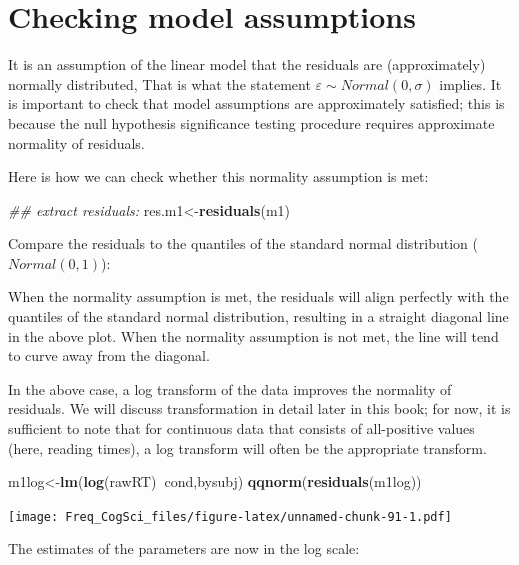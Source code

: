 \documentclass[12pt,]{krantz}
\newenvironment{Shaded}{\begin{snugshade}}{\end{snugshade}}
\newcommand{\CommentTok}[1]{\textcolor[rgb]{0.56,0.35,0.01}{\textit{#1}}}
\newcommand{\KeywordTok}[1]{\textcolor[rgb]{0.13,0.29,0.53}{\textbf{#1}}}
\newcommand{\NormalTok}[1]{#1}
\newcommand{\OperatorTok}[1]{\textcolor[rgb]{0.81,0.36,0.00}{\textbf{#1}}}
\begin{document}
\hypertarget{checking-model-assumptions}{%
\section{Checking model assumptions}\label{checking-model-assumptions}}

It is an assumption of the linear model that the residuals are (approximately) normally distributed, That is what the statement \(\varepsilon\sim Normal(0,\sigma)\) implies. It is important to check that model assumptions are approximately satisfied; this is because the null hypothesis significance testing procedure requires approximate normality of residuals.

Here is how we can check whether this normality assumption is met:

\begin{Shaded}
\begin{Highlighting}[]
\CommentTok{## extract residuals:}
\NormalTok{res.m1<-}\KeywordTok{residuals}\NormalTok{(m1)}
\end{Highlighting}
\end{Shaded}

Compare the residuals to the quantiles of the standard normal distribution (\(Normal(0,1)\)):

When the normality assumption is met, the residuals will align perfectly with the quantiles of the standard normal distribution, resulting in a straight diagonal line in the above plot. When the normality assumption is not met, the line will tend to curve away from the diagonal.

In the above case, a log transform of the data improves the normality of residuals. We will discuss transformation in detail later in this book; for now, it is sufficient to note that for continuous data that consists of all-positive values (here, reading times), a log transform will often be the appropriate transform.

\begin{Shaded}
\begin{Highlighting}[]
\NormalTok{m1log<-}\KeywordTok{lm}\NormalTok{(}\KeywordTok{log}\NormalTok{(rawRT)}\OperatorTok{~}\NormalTok{cond,bysubj)}
\KeywordTok{qqnorm}\NormalTok{(}\KeywordTok{residuals}\NormalTok{(m1log))}
\end{Highlighting}
\end{Shaded}

\texttt{[image: Freq\_CogSci\_files/figure-latex/unnamed-chunk-91-1.pdf]}

The estimates of the parameters are now in the log scale:
\end{document}
